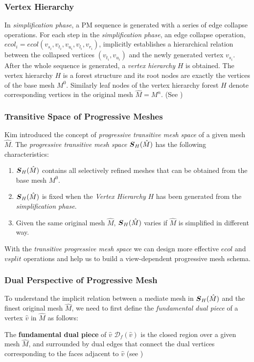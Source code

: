 \subsubsection{Vertex Hierarchy}
\label{subsection:theoreticalVHF}
In \emph{simplification phase}, a PM sequence is generated with a series of edge collapse operations\cite{Hoppe:1997:VRP}. For each step in the \emph{simplification phase}, an edge collapse operation, $ecol_i=ecol(v_{s_i},v_{t_i},v_{u_i},v_{l_i},v_{r_i})$, implicitly establishes a hierarchical relation between the collapsed vertices $(v_{t_i},v_{u_i})$ and the newly generated vertex $v_{s_i}$. After the whole sequence is generated, a \emph{vertex hierarchy} $H$ is obtained. The vertex hierarchy $H$ is a forest structure and its root nodes are exactly the vertices of the base mesh $M^0$. Similarly leaf nodes of the vertex hierarchy forest $H$ denote corresponding vertices in the original mesh $\hat{M}=M^n$. (See )\\


\subsubsection{Transitive Space of Progressive Meshes}
\label{theo:tspm}
Kim \etal\cite{Kim:2003:TransitiveMeshSpace}\cite{Kim:2001:trulyselective} introduced the concept of \emph{progressive transitive mesh space} of a given mesh $\hat{M}$. The \emph{progressive transitive mesh space $\boldsymbol{S}_H(\hat{M})$} has the following characteristics:
\begin{enumerate}
\item
$\boldsymbol{S}_H(\hat{M})$ contains all selectively refined meshes that can be obtained from the base mesh $M^0$.
\item
$\boldsymbol{S}_H(\hat{M})$ is fixed when the \emph{Vertex Hierarchy} $H$ has been generated from the \emph{simplification phase}. 
\item
Given the same original mesh $\hat{M}$, $\boldsymbol{S}_H(\hat{M})$ varies if $\hat{M}$ is simplified in different way. 
\end{enumerate}
With the \emph{transitive progressive mesh space} we can design more effective $ecol$ and $vsplit$ operations and help us to build a view-dependent progressive mesh schema. 
\subsubsection{Dual Perspective of Progressive Mesh}
\label{theo:dppm}
To understand the implicit relation between a mediate mesh in $\boldsymbol{S}_H(\hat{M})$ and the finest original mesh $\hat{M}$, we need to first define the \emph{fundamental dual piece} of a vertex $\hat{v}$ in $\hat{M}$ as follows\cite{Kim:2001:trulyselective}: 
\begin{defn}
The \textbf{fundamental dual piece} of $\hat{v}$ $\mathcal{D}_f(\hat{v})$ is the closed region over a given mesh $\hat{M}$, and surrounded by dual edges that connect the dual vertices corresponding to the faces adjacent to $\hat{v}$ (see )
\end{defn}



